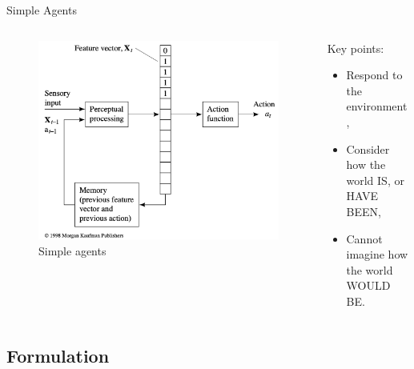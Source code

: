 \documentclass{beamer}
\begin{document}
\begin{frame}{Simple Agents}
\begin{columns}
    \begin{column}{.6\textwidth}
        \begin{figure}[htpb]
            \centering
            \includegraphics[width=0.8\linewidth]{pic/statemachine.png}
            \caption{Simple agents}
        \end{figure}
    \end{column}

    \pause
    \begin{column}{.4\textwidth}
    \begin{exampleblock}{Key points:}
        \begin{itemize}[<+-| alert@+>]
            \item Respond to the environment,

            \item Consider how the world IS, or HAVE BEEN,

            \item Cannot imagine how the world WOULD BE.
        \end{itemize}        
    \end{exampleblock}

    \end{column}  
\end{columns}

\end{frame}


\subsection{Formulation}
\end{document}
